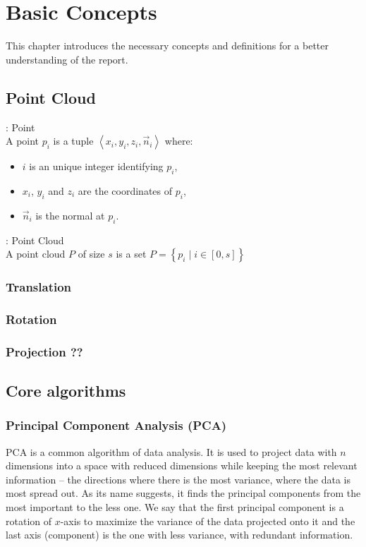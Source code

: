 \chapter{Basic Concepts}
\label{ch:background}
This chapter introduces the necessary concepts and definitions for a better understanding of the report.

\section{Point Cloud}
\begin{definition}{: Point}
  \\A point $p_i$ is a tuple $\left\langle x_i, y_i, z_i, \vec{n}_i \right\rangle$ where:
  \begin{itemize}
    \item $i$ is an unique integer identifying $p_i$,
    \item $x_i$, $y_i$ and $z_i$ are the coordinates of $p_i$,
    \item $\vec{n}_i$ is the normal at $p_i$.
  \end{itemize}
\end{definition}

\begin{definition}{: Point Cloud}
  \\A point cloud $P$ of size $s$ is a set $P = \left\lbrace p_i \mid i \in [0, s]  \right\rbrace$
\end{definition}

\subsection{Translation}
\subsection{Rotation}
\subsection{Projection ??}

\section{Core algorithms}

\subsection{Principal Component Analysis (PCA)}
\label{subsc:pca}
PCA is a common algorithm of data analysis. It is used to project data with $n$ dimensions into a space with reduced dimensions while keeping the most relevant information -- the directions where there is the most variance, where the data is most spread out. As its name suggests, it finds the principal components from the most important to the less one. We say that the first principal component is a rotation of $x$-axis to maximize the variance of the data projected onto it and the last axis (component) is the one with less variance, with redundant information.

